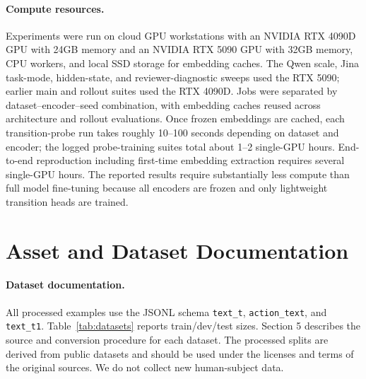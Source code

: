 \documentclass{article}
\begin{document}
\paragraph{Compute resources.}
Experiments were run on cloud GPU workstations with an NVIDIA RTX 4090D GPU with 24GB memory and an NVIDIA RTX 5090 GPU with 32GB memory, CPU workers, and local SSD storage for embedding caches. The Qwen scale, Jina task-mode, hidden-state, and reviewer-diagnostic sweeps used the RTX 5090; earlier main and rollout suites used the RTX 4090D. Jobs were separated by dataset--encoder--seed combination, with embedding caches reused across architecture and rollout evaluations. Once frozen embeddings are cached, each transition-probe run takes roughly 10--100 seconds depending on dataset and encoder; the logged probe-training suites total about 1--2 single-GPU hours. End-to-end reproduction including first-time embedding extraction requires several single-GPU hours. The reported results require substantially less compute than full model fine-tuning because all encoders are frozen and only lightweight transition heads are trained.

\section{Asset and Dataset Documentation}

\paragraph{Dataset documentation.}
All processed examples use the JSONL schema \texttt{text\_t}, \texttt{action\_text}, and \texttt{text\_t1}. Table~\ref{tab:datasets} reports train/dev/test sizes. Section 5 describes the source and conversion procedure for each dataset. The processed splits are derived from public datasets and should be used under the licenses and terms of the original sources. We do not collect new human-subject data.
\end{document}
